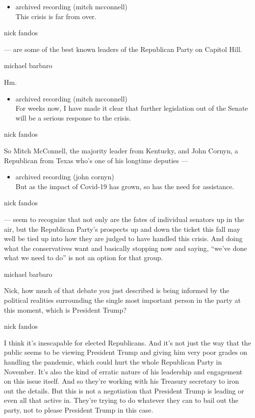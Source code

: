 \begin{itemize}
\tightlist
\item
  archived recording (mitch mcconnell)\\
  This crisis is far from over.
\end{itemize}

nick fandos

--- are some of the best known leaders of the Republican Party on
Capitol Hill.

michael barbaro

Hm.

\begin{itemize}
\tightlist
\item
  archived recording (mitch mcconnell)\\
  For weeks now, I have made it clear that further legislation out of
  the Senate will be a serious response to the crisis.
\end{itemize}

nick fandos

So Mitch McConnell, the majority leader from Kentucky, and John Cornyn,
a Republican from Texas who's one of his longtime deputies ---

\begin{itemize}
\tightlist
\item
  archived recording (john cornyn)\\
  But as the impact of Covid-19 has grown, so has the need for
  assistance.
\end{itemize}

nick fandos

--- seem to recognize that not only are the fates of individual senators
up in the air, but the Republican Party's prospects up and down the
ticket this fall may well be tied up into how they are judged to have
handled this crisis. And doing what the conservatives want and basically
stopping now and saying, ``we've done what we need to do'' is not an
option for that group.

michael barbaro

Nick, how much of that debate you just described is being informed by
the political realities surrounding the single most important person in
the party at this moment, which is President Trump?

nick fandos

I think it's inescapable for elected Republicans. And it's not just the
way that the public seems to be viewing President Trump and giving him
very poor grades on handling the pandemic, which could hurt the whole
Republican Party in November. It's also the kind of erratic nature of
his leadership and engagement on this issue itself. And so they're
working with his Treasury secretary to iron out the details. But this is
not a negotiation that President Trump is leading or even all that
active in. They're trying to do whatever they can to bail out the party,
not to please President Trump in this case.


